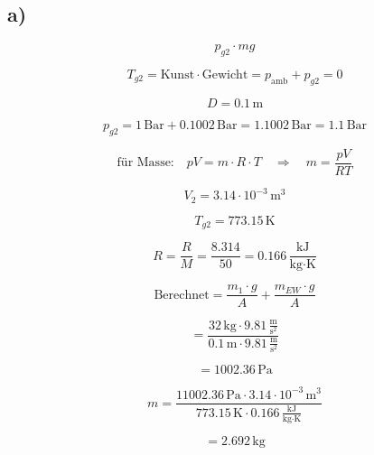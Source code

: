 

\subsection*{a)}

\[
p_{g2} \cdot mg
\]

\[
T_{g2} = \text{Kunst} \cdot \text{Gewicht} = p_{\text{amb}} + p_{g2} = 0
\]

\[
D = 0.1 \, \text{m}
\]

\[
p_{g2} = 1 \, \text{Bar} + 0.1002 \, \text{Bar} = 1.1002 \, \text{Bar} = 1.1 \, \text{Bar}
\]

\[
\text{für Masse:} \quad pV = m \cdot R \cdot T \quad \Rightarrow \quad m = \frac{pV}{RT}
\]

\[
V_2 = 3.14 \cdot 10^{-3} \, \text{m}^3
\]

\[
T_{g2} = 773.15 \, \text{K}
\]

\[
R = \frac{R}{M} = \frac{8.314}{50} = 0.166 \, \frac{\text{kJ}}{\text{kg} \cdot \text{K}}
\]

\[
\text{Berechnet} = \frac{m_1 \cdot g}{A} + \frac{m_{EW} \cdot g}{A}
\]

\[
= \frac{32 \, \text{kg} \cdot 9.81 \, \frac{\text{m}}{\text{s}^2}}{0.1 \, \text{m} \cdot 9.81 \, \frac{\text{m}}{\text{s}^2}}
\]

\[
= 1002.36 \, \text{Pa}
\]

\[
m = \frac{11002.36 \, \text{Pa} \cdot 3.14 \cdot 10^{-3} \, \text{m}^3}{773.15 \, \text{K} \cdot 0.166 \, \frac{\text{kJ}}{\text{kg} \cdot \text{K}}}
\]

\[
= 2.692 \, \text{kg}
\]